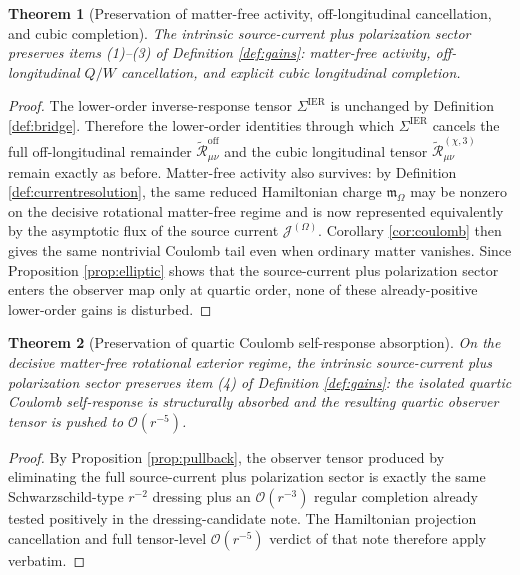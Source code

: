 \documentclass[11pt]{article}
\newcommand{\SourceCurrent}{\mathcal J^{(\Omega)}}
\newcommand{\HamChargeOmega}{\mathfrak m_\Omega}
\newcommand{\SigmaIER}{\Sigma^{\mathrm{IER}}}
\newcommand{\ReOff}{\widetilde{\mathcal R}_{\mu\nu}^{\mathrm{off}}}
\newcommand{\ReLongThree}{\widetilde{\mathcal R}_{\mu\nu}^{(\chi,3)}}
\newtheorem{theorem}{Theorem}
\begin{document}
\begin{theorem}[Preservation of matter-free activity, off-longitudinal cancellation, and cubic completion]
\label{thm:firstthree}
The intrinsic source-current plus polarization sector preserves items (1)--(3) of Definition \ref{def:gains}: matter-free activity, off-longitudinal \(Q/W\) cancellation, and explicit cubic longitudinal completion.
\end{theorem}

\begin{proof}
The lower-order inverse-response tensor \(\SigmaIER\) is unchanged by Definition \ref{def:bridge}. Therefore the lower-order identities through which \(\SigmaIER\) cancels the full off-longitudinal remainder \(\ReOff\) and the cubic longitudinal tensor \(\ReLongThree\) remain exactly as before. Matter-free activity also survives: by Definition \ref{def:currentresolution}, the same reduced Hamiltonian charge \(\HamChargeOmega\) may be nonzero on the decisive rotational matter-free regime and is now represented equivalently by the asymptotic flux of the source current \(\SourceCurrent\). Corollary \ref{cor:coulomb} then gives the same nontrivial Coulomb tail even when ordinary matter vanishes. Since Proposition \ref{prop:elliptic} shows that the source-current plus polarization sector enters the observer map only at quartic order, none of these already-positive lower-order gains is disturbed.
\end{proof}

\begin{theorem}[Preservation of quartic Coulomb self-response absorption]
\label{thm:quartic}
On the decisive matter-free rotational exterior regime, the intrinsic source-current plus polarization sector preserves item (4) of Definition \ref{def:gains}: the isolated quartic Coulomb self-response is structurally absorbed and the resulting quartic observer tensor is pushed to \(\mathcal O(r^{-5})\).
\end{theorem}

\begin{proof}
By Proposition \ref{prop:pullback}, the observer tensor produced by eliminating the full source-current plus polarization sector is exactly the same Schwarzschild-type \(r^{-2}\) dressing plus an \(\mathcal O(r^{-3})\) regular completion already tested positively in the dressing-candidate note. The Hamiltonian projection cancellation and full tensor-level \(\mathcal O(r^{-5})\) verdict of that note therefore apply verbatim.
\end{proof}
\end{document}
